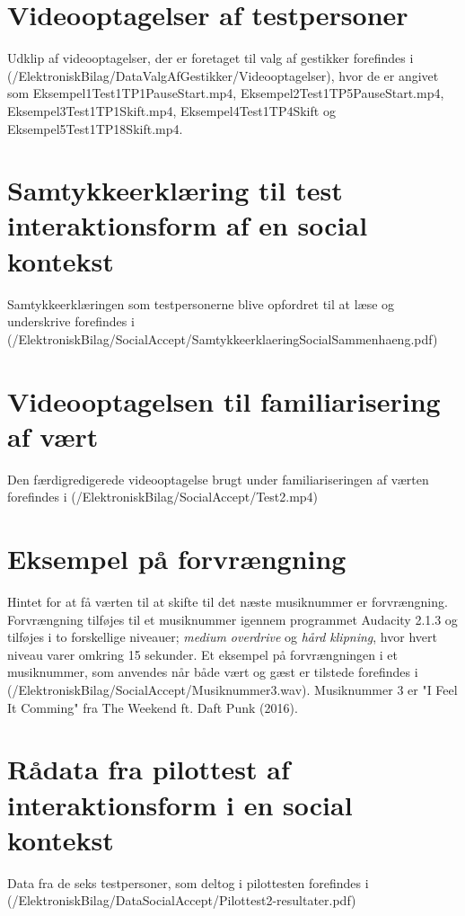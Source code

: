 \section{Videooptagelser af testpersoner}
\label{app:VideooptagelseValgAfGestikkerTestpersoner}
%
Udklip af videooptagelser, der er foretaget til valg af gestikker forefindes i (/ElektroniskBilag/DataValgAfGestikker/Videooptagelser), hvor de er angivet som Eksempel1Test1TP1PauseStart.mp4, Eksempel2Test1TP5PauseStart.mp4, Eksempel3Test1TP1Skift.mp4, Eksempel4Test1TP4Skift og Eksempel5Test1TP18Skift.mp4.
%
\section{Samtykkeerklæring til test interaktionsform af en social kontekst}
\label{app:SamtykkeerklaeringSocialAccept}
%
Samtykkeerklæringen som testpersonerne blive opfordret til at læse og underskrive forefindes i (/ElektroniskBilag/SocialAccept/SamtykkeerklaeringSocialSammenhaeng.pdf)
%
\section{Videooptagelsen til familiarisering af vært}
\label{app:VideooptagelseFam}
%
Den færdigredigerede videooptagelse brugt under familiariseringen af værten forefindes i (/ElektroniskBilag/SocialAccept/Test2.mp4)
%
\section{Eksempel på forvrængning}
\label{app:ForvraengningHint}
%
Hintet for at få værten til at skifte til det næste musiknummer er forvrængning. Forvrængning tilføjes til et musiknummer igennem programmet Audacity 2.1.3 og tilføjes i to forskellige niveauer; \textit{medium overdrive} og \textit{hård klipning}, hvor hvert niveau varer omkring 15 sekunder. Et eksempel på forvrængningen i et musiknummer, som anvendes når både vært og gæst er tilstede forefindes i (/ElektroniskBilag/SocialAccept/Musiknummer3.wav). Musiknummer 3 er "I Feel It Comming" fra The Weekend ft. Daft Punk (2016).
%
\section{Rådata fra pilottest af interaktionsform i en social kontekst}
\label{app:ResultaterPilottestSocialAccept}
%
Data fra de seks testpersoner, som deltog i pilottesten forefindes i \\
(/ElektroniskBilag/DataSocialAccept/Pilottest2-resultater.pdf)
%
